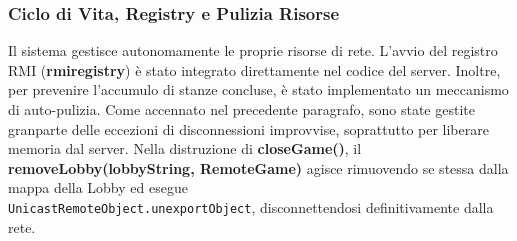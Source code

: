 \subsubsection{Ciclo di Vita, Registry e Pulizia Risorse}
Il sistema gestisce autonomamente le proprie risorse di rete. L'avvio del registro RMI (\textbf{rmiregistry}) è stato integrato direttamente nel codice del server.
Inoltre, per prevenire l'accumulo di stanze concluse, è stato implementato un meccanismo di auto-pulizia. Come accennato nel precedente paragrafo, sono state gestite granparte delle eccezioni di disconnessioni improvvise, soprattutto per liberare memoria dal server. 
Nella distruzione di \textbf{closeGame()}, il \textbf{removeLobby(lobbyString, RemoteGame)} agisce rimuovendo se stessa dalla mappa della Lobby ed esegue \\
\texttt{UnicastRemoteObject.unexportObject}, disconnettendosi definitivamente dalla rete.